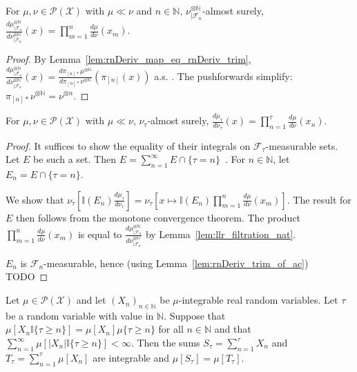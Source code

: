 \begin{lemma}
  \label{lem:llr_filtration_nat}
  For $\mu, \nu \in \mathcal P(\mathcal X)$ with $\mu \ll \nu$ and $n \in \mathbb{N}$, $\nu^{\otimes \mathbb{N}}_{| \mathcal F_n}$-almost surely,
  $\frac{d \mu^{\otimes \mathbb{N}}_{| \mathcal F_n}}{d \nu^{\otimes \mathbb{N}}_{| \mathcal F_n}}(x) = \prod_{m=1}^n \frac{d \mu}{d \nu}(x_m)$.
\end{lemma}

\begin{proof}%
{}
By Lemma~\ref{lem:rnDeriv_map_eq_rnDeriv_trim}, $\frac{d \mu^{\otimes \mathbb{N}}_{| \mathcal F_n}}{d \nu^{\otimes \mathbb{N}}_{| \mathcal F_n}}(x) = \frac{d \pi_{[n]*}\mu^{\otimes \mathbb{N}}}{d \pi_{[n]*}\nu^{\otimes \mathbb{N}}}(\pi_{[n]}(x))$ a.s. . The pushforwards simplify: $\pi_{[n]*}\nu^{\otimes \mathbb{N}} = \nu^{\otimes n}$.
\end{proof}


\begin{lemma}
  \label{lem:llr_stopping_time}
  For $\mu, \nu \in \mathcal P(\mathcal X)$ with $\mu \ll \nu$, $\nu_\tau$-almost surely,
  $\frac{d \mu_\tau}{d \nu_\tau}(x) = \prod_{n=1}^\tau \frac{d \mu}{d \nu}(x_n)$.
\end{lemma}

\begin{proof}
It suffices to show the equality of their integrals on $\mathcal F_\tau$-measurable sets. Let $E$ be such a set.
Then $E = \sum_{n=1}^\infty E \cap \{\tau = n\}$~. For $n \in \mathbb{N}$, let $E_n = E \cap \{\tau = n\}$.

We show that $\nu_\tau \left[\mathbb{I}(E_n) \frac{d \mu_\tau}{d \nu_\tau}\right] = \nu_\tau\left[x \mapsto \mathbb{I}(E_n)\prod_{m=1}^n \frac{d \mu}{d \nu}(x_m)\right]$.
The result for $E$ then follows from the monotone convergence theorem.
The product $\prod_{m=1}^n \frac{d \mu}{d \nu}(x_m)$ is equal to $\frac{d \mu^{\otimes \mathbb{N}}_{| \mathcal F_n}}{d \nu^{\otimes \mathbb{N}}_{| \mathcal F_n}}$ by Lemma~\ref{lem:llr_filtration_nat}.

$E_n$ is $\mathcal F_n$-measurable, hence (using Lemma~\ref{lem:rnDeriv_trim_of_ac})
TODO

\end{proof}


\begin{lemma}
  \label{lem:wald_equation}
  \notready
  \uses{}
  Let $\mu \in \mathcal P(\mathcal X)$ and let $(X_n)_{n \in \mathbb{N}}$ be $\mu$-integrable real random variables. Let $\tau$ be a random variable with value in $\mathbb{N}$.
  Suppose that $\mu[X_n \mathbb{I}\{\tau \ge n\}] = \mu[X_n]\mu\{\tau \ge n\}$ for all $n \in \mathbb{N}$ and that $\sum_{n=1}^\infty \mu[|X_n| \mathbb{I}\{\tau \ge n\}] < \infty$. Then the sums $S_\tau = \sum_{n=1}^\tau X_n$ and $T_\tau = \sum_{n=1}^\tau \mu[X_n]$ are integrable and $\mu[S_\tau] = \mu[T_\tau]$. 
\end{lemma}

